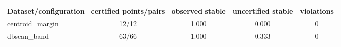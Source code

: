 \begin{tabular}{lcccc}
\toprule
Dataset/configuration & certified points/pairs & observed stable & uncertified stable & violations \\
\midrule
centroid\_margin & 12/12 & 1.000 & 0.000 & 0 \\
dbscan\_band & 63/66 & 1.000 & 0.333 & 0 \\
\bottomrule
\end{tabular}
